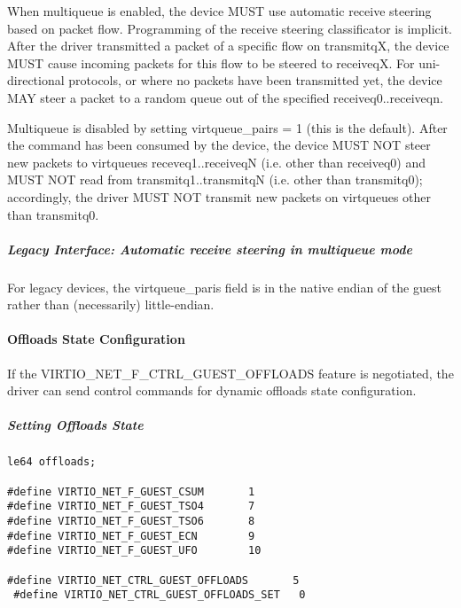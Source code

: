 When multiqueue is enabled, the device MUST use automatic receive steering
based on packet flow. Programming of the receive steering
classificator is implicit. After the driver transmitted a packet of a specific
flow on transmitqX, the device MUST cause incoming packets for this flow to
be steered to receiveqX. For uni-directional protocols, or where
no packets have been transmitted yet, the device MAY steer a packet
to a random queue out of the specified receiveq0..receiveqn.

Multiqueue is disabled by setting virtqueue_pairs = 1 (this is
the default). After the command has been consumed by the device, the
device MUST NOT steer new packets to virtqueues
receveq1..receiveqN (i.e. other than receiveq0) and MUST NOT read from
transmitq1..transmitqN (i.e. other than transmitq0); accordingly,
the driver MUST NOT transmit new packets on virtqueues other than
transmitq0.

\subparagraph{Legacy Interface: Automatic receive steering in multiqueue mode}\label{sec:Device Types / Network Device / Device Operation / Control Virtqueue / Automatic receive steering in multiqueue mode / Legacy Interface: Automatic receive steering in multiqueue mode}
For legacy devices, the virtqueue_paris field is in the
native endian of the guest rather than (necessarily) little-endian.

\paragraph{Offloads State Configuration}\label{sec:Device Types / Network Device / Device Operation / Control Virtqueue / Offloads State Configuration}

If the VIRTIO_NET_F_CTRL_GUEST_OFFLOADS feature is negotiated, the driver can
send control commands for dynamic offloads state configuration.

\subparagraph{Setting Offloads State}\label{sec:Device Types / Network Device / Device Operation / Control Virtqueue / Offloads State Configuration / Setting Offloads State}

\begin{lstlisting}
le64 offloads;

#define VIRTIO_NET_F_GUEST_CSUM       1
#define VIRTIO_NET_F_GUEST_TSO4       7
#define VIRTIO_NET_F_GUEST_TSO6       8
#define VIRTIO_NET_F_GUEST_ECN        9
#define VIRTIO_NET_F_GUEST_UFO        10

#define VIRTIO_NET_CTRL_GUEST_OFFLOADS       5
 #define VIRTIO_NET_CTRL_GUEST_OFFLOADS_SET   0
\end{lstlisting}

